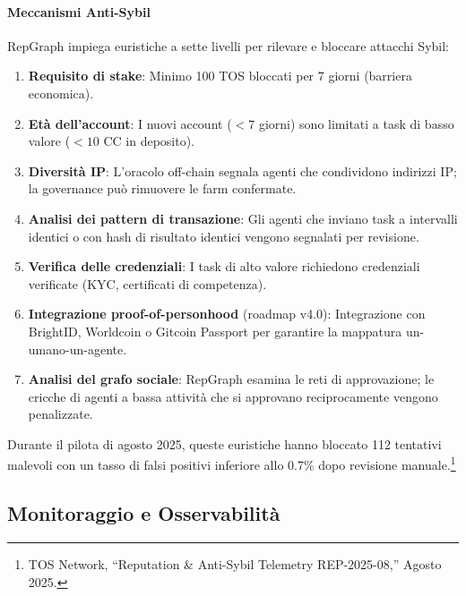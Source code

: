 \documentclass[11pt]{article}
\begin{document}
\paragraph{Meccanismi Anti-Sybil} RepGraph impiega euristiche a sette livelli per rilevare e bloccare attacchi Sybil:
\begin{enumerate}[noitemsep]
  \item \textbf{Requisito di stake}: Minimo 100 TOS bloccati per 7 giorni (barriera economica).
  \item \textbf{Età dell'account}: I nuovi account ($<7$ giorni) sono limitati a task di basso valore ($<10$ CC in deposito).
  \item \textbf{Diversità IP}: L'oracolo off-chain segnala agenti che condividono indirizzi IP; la governance può rimuovere le farm confermate.
  \item \textbf{Analisi dei pattern di transazione}: Gli agenti che inviano task a intervalli identici o con hash di risultato identici vengono segnalati per revisione.
  \item \textbf{Verifica delle credenziali}: I task di alto valore richiedono credenziali verificate (KYC, certificati di competenza).
  \item \textbf{Integrazione proof-of-personhood} (roadmap v4.0): Integrazione con BrightID, Worldcoin o Gitcoin Passport per garantire la mappatura un-umano-un-agente.
  \item \textbf{Analisi del grafo sociale}: RepGraph esamina le reti di approvazione; le cricche di agenti a bassa attività che si approvano reciprocamente vengono penalizzate.
\end{enumerate}
Durante il pilota di agosto 2025, queste euristiche hanno bloccato 112 tentativi malevoli con un tasso di falsi positivi inferiore allo 0.7\% dopo revisione manuale.\footnote{TOS Network, ``Reputation \& Anti-Sybil Telemetry REP-2025-08,'' Agosto 2025.}

\subsection{Monitoraggio e Osservabilità}
\end{document}
